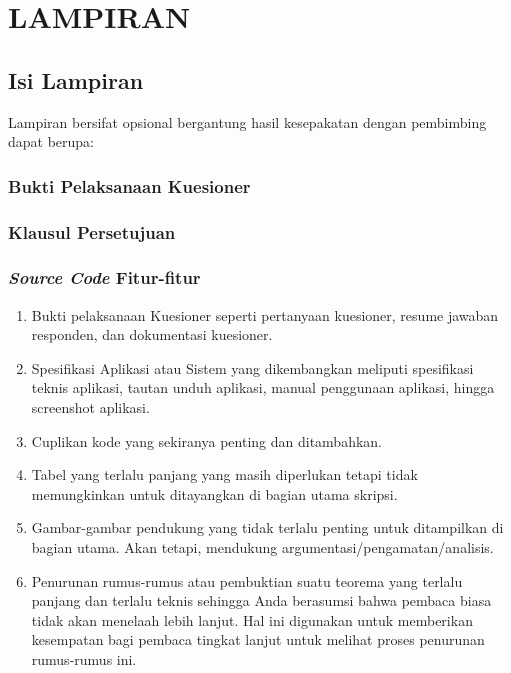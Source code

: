 \chapter*{LAMPIRAN}

\section{Isi Lampiran}

Lampiran bersifat opsional bergantung hasil kesepakatan dengan pembimbing 
dapat berupa:
\subsection{Bukti Pelaksanaan Kuesioner}

\subsection{Klausul Persetujuan}

\subsection{\textit{Source Code} Fitur-fitur}
\begin{enumerate}
\item Bukti pelaksanaan Kuesioner seperti pertanyaan kuesioner, resume jawaban 
responden, dan dokumentasi kuesioner. 
\item Spesifikasi Aplikasi atau Sistem yang dikembangkan meliputi spesifikasi 
teknis aplikasi, tautan unduh aplikasi, manual penggunaan aplikasi, hingga 
screenshot aplikasi. 
\item Cuplikan kode yang sekiranya penting dan ditambahkan. 
\item Tabel yang terlalu panjang yang masih diperlukan tetapi tidak 
memungkinkan untuk ditayangkan di bagian utama skripsi.
\item Gambar-gambar pendukung yang tidak terlalu penting untuk ditampilkan di 
bagian utama. Akan tetapi, mendukung argumentasi/pengamatan/analisis.
\item Penurunan rumus-rumus atau pembuktian suatu teorema yang terlalu 
panjang dan terlalu teknis sehingga Anda berasumsi bahwa pembaca biasa 
tidak akan menelaah lebih lanjut. Hal ini digunakan untuk memberikan 
kesempatan bagi pembaca tingkat lanjut untuk melihat proses penurunan 
rumus-rumus ini.
\end{enumerate}